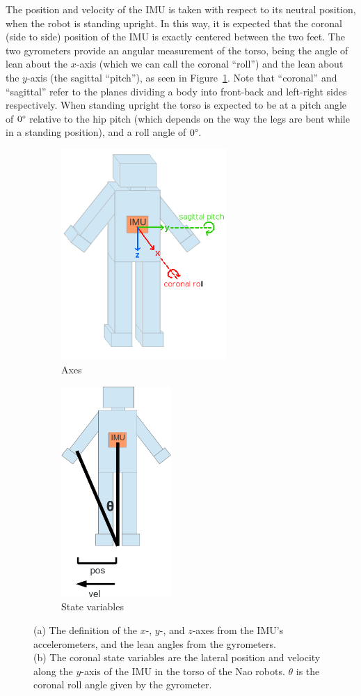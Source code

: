 The position and velocity of the IMU is taken with respect to its neutral position, when the robot is standing upright. In this way, it is expected that the coronal (side to side) position of the IMU is exactly centered between the two feet. The two gyrometers provide an angular measurement of the torso, being the angle of lean about the $x$-axis (which we can call the coronal ``roll'') and the lean about the $y$-axis (the sagittal ``pitch''), as seen in Figure~\ref{fig:trig}. Note that ``coronal'' and ``sagittal'' refer to the planes dividing a body into front-back and left-right sides respectively.  When standing upright the torso is expected to be at a pitch angle of $0\degree$ relative to the hip pitch (which depends on the way the legs are bent while in a standing position), and a roll angle of $0\degree$.

\begin{figure}[h]
\centering
\begin{subfigure}{0.4\textwidth}
  \centering
  \includegraphics[height=8cm]{img/axes.png}
  \caption{Axes}
  \label{fig:trig}
\end{subfigure}
\begin{subfigure}{0.4\textwidth}
  \centering
  \includegraphics[height=8cm]{img/lean_trig.png}
  \caption{State variables}
  \label{fig:triangle}
\end{subfigure}
\caption{(a) The definition of the $x$-, $y$-, and $z$-axes from the IMU's accelerometers, and the lean angles from the gyrometers.\\(b) The coronal state variables are the lateral position and velocity along the $y$-axis of the IMU in the torso of the Nao robots. $\theta$ is the coronal roll angle given by the gyrometer.}
\label{fig:total}
\end{figure}

